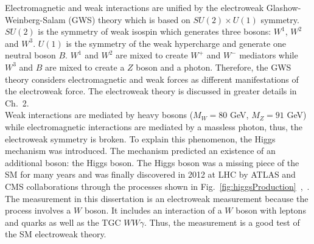 Electromagnetic and weak interactions are unified by the electroweak Glashow-Weinberg-Salam (GWS) theory which is based on $SU(2) \times U(1)$ symmetry. $SU(2)$ is the symmetry of weak isospin which generates three bosons: $W^1$, $W^2$ and $W^3$. $U(1)$ is the symmetry of the weak hypercharge and generate one neutral boson $B$. $W^1$ and $W^2$ are mixed to create $W^+$ and $W^-$ mediators while $W^3$ and $B$ are mixed to create a $Z$ boson and a photon. Therefore, the GWS theory considers electromagnetic and weak forces as different manifestations of the electroweak force. The electroweak theory is discussed in greater details in Ch.~2.\\

Weak interactions are mediated by heavy bosons ($M_W=80$ GeV, $M_Z=91$ GeV) while electromagnetic interactions are mediated by a massless photon, thus, the electroweak symmetry is broken. To explain this phenomenon, the Higgs mechanism was introduced. The mechanism predicted an existence of an additional boson: the Higgs boson. The Higgs boson was a missing piece of the SM for many years and was finally discovered in 2012 at LHC by ATLAS and CMS collaborations through the processes shown in Fig.~\ref{fig:higgsProduction}~\cite{ref_HiggsPaperCMS},~\cite{ref_HiggsPaperATLAS}.\\

The measurement in this dissertation is an electroweak measurement because the process involves a $W$ boson. It includes an interaction of a $W$ boson with leptons and quarks as well as the TGC $WW\gamma$. Thus, the measurement is a good test of the SM electroweak theory.\\ 



